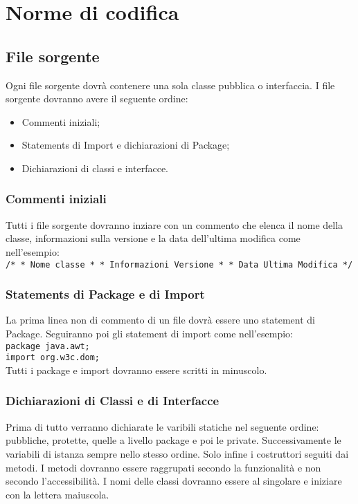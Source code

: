 \chapter{Norme di codifica}
\section{File sorgente}
Ogni file sorgente dovr\`a contenere una sola classe pubblica o interfaccia. I file sorgente dovranno avere il seguente ordine:
\begin{itemize}
\item Commenti iniziali;
\item Statements di Import e dichiarazioni di Package;
\item Dichiarazioni di classi e interfacce.
\end{itemize}
\subsection{Commenti iniziali}
Tutti i file sorgente dovranno inziare con un commento che elenca il nome della classe, informazioni sulla versione e la data dell'ultima modifica come nell'esempio: \\
 \newline
\texttt{/* \newline
* Nome classe \newline
* \newline
* Informazioni Versione \newline
* \newline
* Data Ultima Modifica \newline
*/ \\}
 \newline
\subsection{Statements di Package e di Import}
La prima linea non di commento di un file dovr\`a essere uno statement di Package. Seguiranno poi gli statement di import come nell'esempio: \\
 \newline
\texttt{package java.awt; \\ 
import org.w3c.dom; \\}
Tutti i package e import dovranno essere scritti in minuscolo.
\subsection{Dichiarazioni di Classi e di Interfacce}
Prima di tutto verranno dichiarate le varibili statiche nel seguente ordine: pubbliche, protette, quelle a livello package e poi le private. Successivamente le variabili di istanza sempre nello stesso ordine. Solo infine i costruttori seguiti dai metodi. I metodi dovranno essere raggrupati secondo la funzionalit\`a e non secondo l'accessibilit\`a. I nomi delle classi dovranno essere al singolare e iniziare con la lettera maiuscola.

